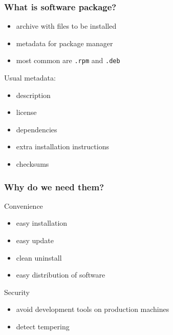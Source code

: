 
\begin{frame}[t]
   \frametitle{What is software package?}
   \begin{itemize}
      \item archive with files to be installed
      \item metadata for package manager
      \item most common are \texttt{.rpm} and \texttt{.deb}
   \end{itemize}
   \vspace{.5cm}
   Usual metadata:
      \begin{itemize}
         \item description
         \item license
         \item dependencies
         \item extra installation instructions
         \item checksums
      \end{itemize}
\end{frame}

\begin{frame}[t]
   \frametitle{Why do we need them?}
   Convenience
   \begin{itemize}
      \item easy installation
      \item easy update
      \item clean uninstall
      \item easy distribution of software
   \end{itemize}
   \vspace{.5cm}
   Security
   \begin{itemize}
      \item avoid development tools on production machines
      \item detect tempering
   \end{itemize}
\end{frame}

